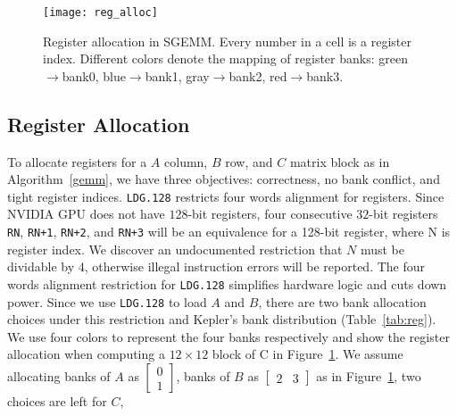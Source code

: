 \label{sec:register}
\begin{figure}[htbp]
\begin{center}
\texttt{[image: reg\_alloc]}
\caption{\small Register allocation in SGEMM. Every number in a cell is a register index.
Different colors denote the mapping of register banks: green$\rightarrow$bank0,
    blue$\rightarrow$bank1, gray$\rightarrow$bank2, red$\rightarrow$bank3.}
\label{fig:reg}
\end{center}
\end{figure}
\subsection{Register Allocation}

To allocate registers for a $A$ column, $B$ row, and $C$ matrix block as in Algorithm~\ref{gemm}, we have three objectives:
correctness, no bank conflict, and tight register indices.
{\tt LDG.128} restricts four words alignment for registers.
Since NVIDIA GPU does not have $128$-bit registers, 
four consecutive $32$-bit registers {\tt RN}, {\tt RN+1}, {\tt RN+2}, and {\tt RN+3} will be an equivalence for a 128-bit
register, where N is register index.
We discover an undocumented restriction that $N$ must be dividable by $4$,
otherwise illegal instruction errors will be reported.
The four words alignment restriction for {\tt LDG.128} simplifies hardware logic and cuts down power.
Since we use {\tt LDG.128} to load $A$ and $B$, there are two bank allocation choices under this restriction and Kepler's bank distribution (Table~\ref{tab:reg}).
We use four colors to represent the four banks respectively and show the register allocation when computing a $12 \times 12$ block of C in Figure~\ref{fig:reg}.
We assume allocating banks of $A$ as $\begin{bmatrix} 0 \\ 1  \end{bmatrix}$,
   banks of $B$ as $\begin{bmatrix} 2 & 3 \end{bmatrix}$ 
   as in Figure~\ref{fig:reg}, two choices are left for $C$,
